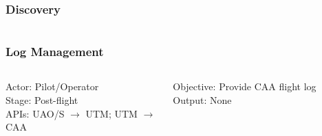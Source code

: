 \documentclass[usenames,dvipsnames,aspectratio=169,serif]{beamer}
\begin{document}
\begin{frame}
   \frametitle{Discovery}
   \begin{columns}[t]
      \begin{column}{0.5\textwidth}
      \end{column}
      \begin{column}{0.5\textwidth}
      \end{column}
   \end{columns}
\end{frame}

\begin{frame}
   \frametitle{Log Management}
   \begin{columns}[t]
      \begin{column}{0.5\textwidth}
         Actor: Pilot/Operator \\
         Stage: Post-flight \\
         APIs: UAO/S $\rightarrow$ UTM; UTM $\rightarrow$ CAA \\
      \end{column}
      \begin{column}{0.5\textwidth}
         Objective: Provide CAA flight log
         Output: None
      \end{column}
   \end{columns}
\end{frame}
\end{document}
